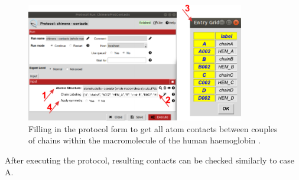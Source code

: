 \begin{itemize}
        \begin{figure}[H]
            \centering 
            \captionsetup{width=.7\linewidth} 
            \includegraphics[width=0.85\textwidth]{Images/Fig51}
            \caption{Filling in the  protocol form to get all atom contacts between couples of chains within the macromolecule of the human haemoglobin .}
            \label{fig:contacts_whole_macromolecule}
        \end{figure}
        
 After executing the protocol, resulting contacts can be checked similarly to case A. 
\end{itemize}



 



















